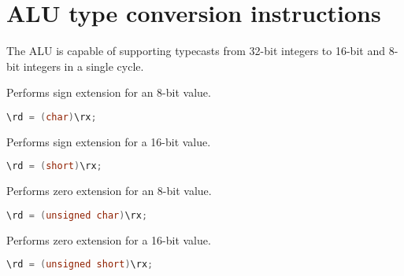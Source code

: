 
\section{ALU type conversion instructions}


The \rvex{} ALU is capable of supporting typecasts from 32-bit integers to
16-bit and 8-bit integers in a single cycle.

Performs sign extension for an 8-bit value.

\begin{lstlisting}[numbers=none, basicstyle=\ttfamily\footnotesize, language=C++]
\rd = (char)\rx;
\end{lstlisting}

Performs sign extension for a 16-bit value.

\begin{lstlisting}[numbers=none, basicstyle=\ttfamily\footnotesize, language=C++]
\rd = (short)\rx;
\end{lstlisting}

Performs zero extension for an 8-bit value.

\begin{lstlisting}[numbers=none, basicstyle=\ttfamily\footnotesize, language=C++]
\rd = (unsigned char)\rx;
\end{lstlisting}

Performs zero extension for a 16-bit value.

\begin{lstlisting}[numbers=none, basicstyle=\ttfamily\footnotesize, language=C++]
\rd = (unsigned short)\rx;
\end{lstlisting}
